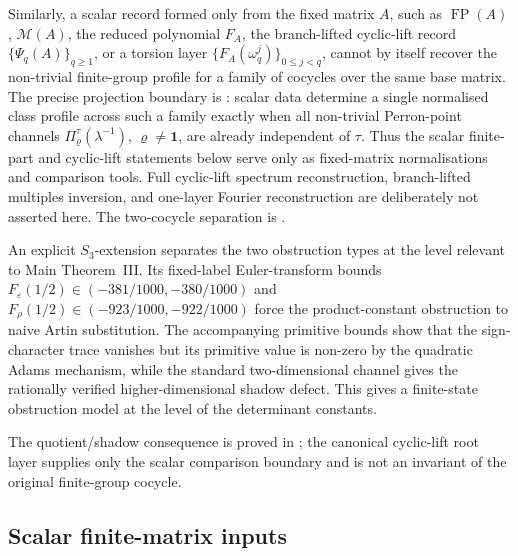 \documentclass[11pt,a4paper]{amsart}
\theoremstyle{plain}
\theoremstyle{definition}
\theoremstyle{remark}
\DeclareMathOperator{\FP}{FP}
\begin{document}
Similarly, a scalar record formed only from the fixed matrix \(A\), such
as \(\FP(A)\), \(\mathcal M(A)\), the reduced polynomial \(F_A\), the
branch-lifted cyclic-lift record \(\{\Psi_q(A)\}_{q\ge1}\), or a torsion
layer \(\{F_A(\omega_q^j)\}_{0\le j<q}\), cannot by itself recover the
non-trivial finite-group profile for a family of cocycles over the same
base matrix. The precise projection boundary is
: scalar data determine
a single normalised class profile across such a family exactly when all
non-trivial Perron-point channels
\(\Pi_\varrho^\tau(\lambda^{-1})\), \(\varrho\ne\mathbf1\), are already
independent of \(\tau\). Thus the scalar finite-part and cyclic-lift
statements below serve only as fixed-matrix normalisations and comparison
tools.  Full cyclic-lift spectrum reconstruction, branch-lifted multiples
inversion, and one-layer Fourier reconstruction are deliberately not asserted
here.  The two-cocycle separation is
.

An explicit \(S_3\)-extension separates the two obstruction types at the
level relevant to Main Theorem~III.  Its fixed-label Euler-transform
bounds
\(F_\varepsilon(1/2)\in(-381/1000,-380/1000)\) and
\(F_\rho(1/2)\in(-923/1000,-922/1000)\) force the product-constant
obstruction to naive Artin substitution.  The accompanying primitive
bounds show that the sign-character trace vanishes but its primitive
value is non-zero by the quadratic Adams mechanism, while the standard
two-dimensional channel gives the rationally verified higher-dimensional shadow
defect. This gives a finite-state obstruction model at the level of the
determinant constants.

The quotient/shadow consequence is proved in
; the canonical cyclic-lift root layer supplies only the scalar comparison boundary and is not an invariant of the original finite-group cocycle.






\subsection{Scalar finite-matrix inputs}
\end{document}
